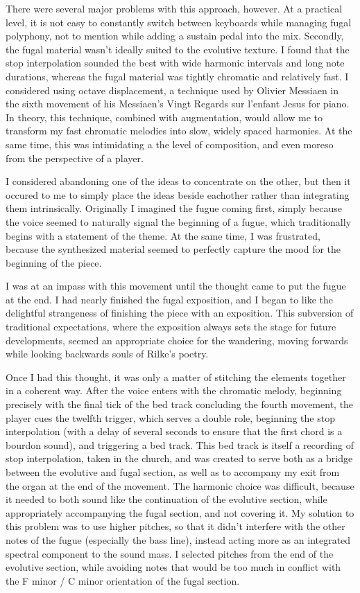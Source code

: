 \documentclass[12pt,twoside,maitrise]{dms_ks}
\theoremstyle{definition}
\begin{document}
There were several major problems with this approach, however. At a practical level, it is not easy to constantly switch between keyboards while managing fugal polyphony, not to mention while adding a sustain pedal into the mix. Secondly, the fugal material wasn't ideally suited to the evolutive texture. I found that the stop interpolation sounded the best with wide harmonic intervals and long note durations, whereas the fugal material was tightly chromatic and relatively fast. I considered using octave displacement, a technique used by Olivier Messiaen in the sixth movement of his Messiaen’s Vingt Regards sur l’enfant Jesus for piano. In theory, this technique, combined with augmentation, would allow me to transform my fast chromatic melodies into slow, widely spaced harmonies. At the same time, this was intimidating a the level of composition, and even moreso from the perspective of a player.

I considered abandoning one of the ideas to concentrate on the other, but then it occured to me to simply place the ideas beside eachother rather than integrating them intrinsically. Originally I imagined the fugue coming first, simply because the voice seemed to naturally signal the beginning of a fugue, which traditionally begins with a statement of the theme. At the same time, I was frustrated, because the synthesized material seemed to perfectly capture the mood for the beginning of the piece.

I was at an impass with this movement until the thought came to put the fugue at the end. I had nearly finished the fugal exposition, and I began to like the delightful strangeness of finishing the piece with an exposition. This subversion of traditional expectations, where the exposition always sets the stage for future developments, seemed an appropriate choice for the wandering, moving forwards while looking backwards souls of Rilke's poetry. 

Once I had this thought, it was only a matter of stitching the elements together in a coherent way. After the voice enters with the chromatic melody, beginning precisely with the final tick of the bed track concluding the fourth movement, the player cues the twelfth trigger, which serves a double role, beginning the stop interpolation (with a delay of several seconds to ensure that the first chord is a bourdon sound), and triggering a bed track. This bed track is itself a recording of stop interpolation, taken in the church, and was created to serve both as a bridge between the evolutive and fugal section, as well as to accompany my exit from the organ at the end of the movement. The harmonic choice was difficult, because it needed to both sound like the continuation of the evolutive section, while appropriately accompanying the fugal section, and not covering it. My solution to this problem was to use higher pitches, so that it didn't interfere with the other notes of the fugue (especially the bass line), instead acting more as an integrated spectral component to the sound mass. I selected pitches from the end of the evolutive section, while avoiding notes that would be too much in conflict with the F minor / C minor orientation of the fugal section.
\end{document}
